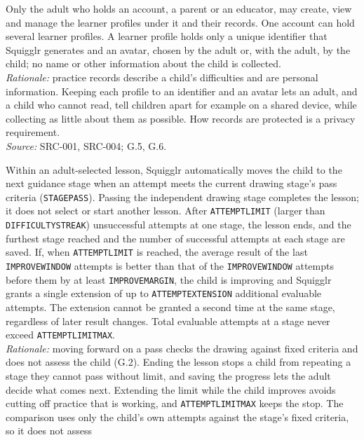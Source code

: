 \documentclass[12pt]{article}
\renewcommand{\_}{\textunderscore\allowbreak}%
\begin{document}
\begin{description}[style=nextline]
\item[BR-001] Only the adult who holds an account, a parent or an educator, may
create, view and manage the learner profiles under it and their records. One
account can hold several learner profiles. A learner profile holds only a
unique identifier that Squigglr generates and an avatar, chosen by the adult or,
with the adult, by the child;
no name or other information about the child is collected.\\
\emph{Rationale:} practice records describe a child's difficulties and are
personal information. Keeping each profile to an identifier and an avatar lets
an adult, and a child who cannot read, tell children apart for example on a shared device,
while collecting as little about them as possible. How records are protected is
a privacy requirement.\\
\emph{Source:} SRC-001, SRC-004; G.5, G.6.
\item[BR-002] Within an adult-selected lesson, Squigglr automatically moves the
child to the next guidance stage when an attempt meets the current drawing
stage's pass criteria (\texttt{STAGE\_PASS}). Passing the independent drawing
stage completes the lesson; it does not select or start another lesson. After
\texttt{ATTEMPT\_LIMIT} (larger than \texttt{DIFFICULTY\_STREAK}) unsuccessful
attempts at one stage, the lesson ends, and the furthest stage reached and the
number of successful attempts at each stage are saved. If, when
\texttt{ATTEMPT\_LIMIT} is reached, the average result of the last
\texttt{IMPROVE\_WINDOW} attempts is better than that of the
\texttt{IMPROVE\_WINDOW} attempts before them by at least
\texttt{IMPROVE\_MARGIN}, the child is improving and Squigglr grants a single
extension of up to \texttt{ATTEMPT\_EXTENSION} additional evaluable attempts.
The extension cannot be granted a second time at the same stage, regardless of
later result changes. Total evaluable attempts at a stage never exceed
\texttt{ATTEMPT\_LIMIT\_MAX}.\\
\emph{Rationale:} moving forward on a pass checks the drawing against fixed
criteria and does not assess the child (G.2). Ending the lesson stops a child
from repeating a stage they cannot pass without limit, and saving the progress
lets the adult decide what comes next. Extending the limit while the child
improves avoids cutting off practice that is working, and
\texttt{ATTEMPT\_LIMIT\_MAX} keeps the stop. The comparison uses only the
child's own attempts against the stage's fixed criteria, so it does not assess

\end{description}
\end{document}
